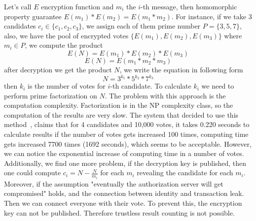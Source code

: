 \documentclass[applsci,article,submit,moreauthors,pdftex]{Definitions/mdpi}
\begin{document}
Let's call $E$ encryption function and $m_i$ the $i$-th message, then homomorphic property guarantee $E(m_1) * E(m_2) = E(m_1 * m_2)$. 
For instance, if we take 3 candidates $c_i \in \{c_1, c_2, c_3\}$, we assign each of them prime number $P = \{3, 5, 7\}$, also, we have the pool of encrypted votes $\{E(m_1), E(m_2), E(m_3)\}$ where $m_i \in P$, we compute the product 
\begin{equation}
  E(N) = E(m_1) * E(m_2) * E(m_3)  
\end{equation}
\begin{equation}
E(N) = E(m_1 * m_2 * m_3)
\end{equation}
after decryption we get the product $N$, we write the equation in following form 
\begin{equation}
N = 3^{k_1} * 5^{k_2} * 7^{k_3}
\end{equation}
then $k_i$ is the number of votes for $i$-th candidate. To calculate $k_i$ we need to perform prime factorization on $N$. 
The problem with this approach is the computation complexity. Factorization is in the NP complexity class, so the computation of the results are very slow. The system that decided to use this method~\cite{polys:online}, claims that for 4 candidates and 10,000 votes, it takes 0.220 seconds to calculate results if the number of votes gets increased 100 times, computing time gets increased 7700 times (1692 seconds), which seems to be acceptable. However, we can notice the exponential increase of computing time in a number of votes.
Additionally, we find one more problem, if the decryption key is published, then one could compute $c_i = N - \frac{N}{m_i}$ for each $m_i$ revealing the candidate for each $m_i$. Moreover, if the assumption "eventually the authorization server will get compromised" holds, and the connection between identity and transaction leak. Then we can connect everyone with their vote. To prevent this, the encryption key can not be published. Therefore trustless result counting is not possible.

\end{document}
